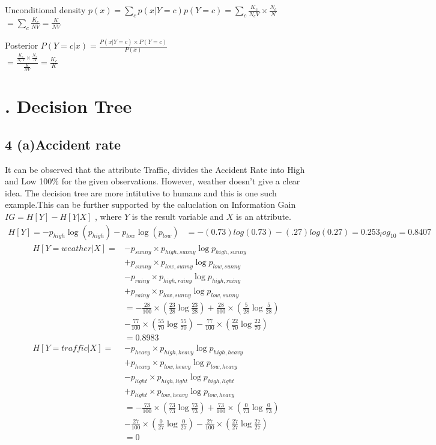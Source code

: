 \documentclass[10pt,letterpaper]{article}
\begin{document}
Unconditional density $p(x)=\sum_c p(x|Y=c)p(Y=c) = \sum_c \frac{K_c}{N_cV} \times \frac{N_c}{N}$\\
$		= \sum_c \frac{K_c}{NV} = \frac{K}{NV}$
		
Posterior $P(Y=c|x)=\frac{P(x|Y=c)\times P(Y=c)}{ P(x) } $\\
$= \frac{\frac{K_c}{N_cV} \times \frac{N_c}{N} }{\frac{K}{NV}} =\frac{K_c}{K} $
\section{. Decision Tree}
\subsection{4 (a)Accident rate}
It can be observed that the attribute Traffic, divides the Accident Rate into High and Low 100\% for the given observations.  However, weather doesn't give a clear idea. The decision tree are more intitutive to humans and this is one such example.This can be further supported by the caluclation on Information Gain \\
$IG=H[Y]-H[Y|X]$ , where $Y$ is the result variable and $X$ is an attribute.\\
\begin{align*}
H[Y]= -p_{high} \log(p_{high}) -p_{low} \log(p_{low})
       &=-(0.73)log(0.73)- (.27)log(0.27)  =0.253 _log_10 = 0.8407 
\end{align*}
\begin{align*}
H[Y=weather|X]=&-p_{sunny} \times p_{high,sunny}\log p_{high,sunny}\\
			&+p_{sunny} \times p_{low,sunny}\log p_{low,sunny}\\
			&-p_{rainy} \times p_{high,rainy}\log p_{high,rainy}\\
			&+p_{rainy} \times p_{low,sunny}\log p_{low,sunny}\\
&=-\frac{28}{100} \times (\frac{23}{28} \log \frac{23}{28})
+\frac{28}{100} \times (\frac{5}{28} \log \frac{5}{28})\\
&-\frac{77}{100} \times (\frac{55}{70} \log \frac{55}{70})
-\frac{77}{100} \times (\frac{22}{70} \log \frac{22}{70})\\
&=0.8983\\
H[Y=traffic|X]=&-p_{heavy} \times p_{high,heavy}\log p_{high,heavy}\\
			&+p_{heavy} \times p_{low,heavy}\log p_{low,heavy}\\
			&-p_{light} \times p_{high,light}\log p_{high,light}\\
			&+p_{light} \times p_{low,heavy}\log p_{low,heavy}\\
&=-\frac{73}{100} \times (\frac{73}{73} \log \frac{73}{73})
+\frac{73}{100} \times (\frac{0}{73} \log \frac{0}{73})\\
&-\frac{27}{100} \times (\frac{0}{27} \log \frac{0}{27})
-\frac{27}{100} \times (\frac{27}{27} \log \frac{27}{27})\\
&=0
\end{align*}
\end{document}
